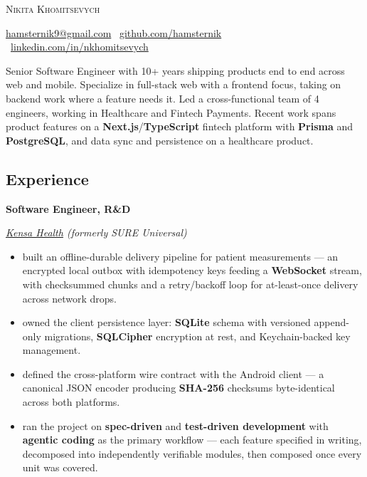 \documentclass[10pt]{article}
\newcommand{\SectionSpacing}{ %
    \vspace*{0.75em}
}
\newcommand{\Experience}[3]{%
    \noindent \textbf{#1}
    \hfill \text{#2} \par
    \noindent \textit{#3} \par
    \normalsize \normalfont \par
}
\begin{document}
\textsc{\huge{Nikita Khomitsevych}}

\SectionSpacing

\noindent
\href{mailto:hamsternik9@gmail.com}{hamsternik9@gmail.com} \textbar\
\href{https://github.com/hamsternik}{github.com/hamsternik} \textbar\
\href{https://www.linkedin.com/in/nkhomitsevych/}{linkedin.com/in/nkhomitsevych}

\SectionSpacing

\noindent
Senior Software Engineer with 10+ years shipping products end to end across web and
mobile. Specialize in full-stack web with a frontend focus, taking on backend work where
a feature needs it. Led a cross-functional team of 4 engineers, working in Healthcare and
Fintech Payments. Recent work spans product features on a \textbf{Next.js}/\textbf{TypeScript}
fintech platform with \textbf{Prisma} and \textbf{PostgreSQL}, and data sync and persistence
on a healthcare product.


\subsection*{Experience}

\Experience
{Software Engineer, R\&D}
{Mar 2025 -- Aug 2026}
{\href{https://www.kensahealth.com/}{Kensa Health} (formerly SURE Universal)}

\noindent
\begin{itemize}[label=-]
  \setlength\itemsep{0em}
\item built an offline-durable delivery pipeline for patient measurements — an encrypted
  local outbox with idempotency keys feeding a \textbf{WebSocket} stream, with checksummed
  chunks and a retry/backoff loop for at-least-once delivery across network drops.
\item owned the client persistence layer: \textbf{SQLite} schema with versioned
  append-only migrations, \textbf{SQLCipher} encryption at rest, and Keychain-backed
  key management.
\item defined the cross-platform wire contract with the Android client — a canonical JSON
  encoder producing \textbf{SHA-256} checksums byte-identical across both platforms.
\item ran the project on \textbf{spec-driven} and \textbf{test-driven development} with
  \textbf{agentic coding} as the primary workflow — each feature specified in writing,
  decomposed into independently verifiable modules, then composed once every unit was
  covered.
\end{itemize}
\end{document}

